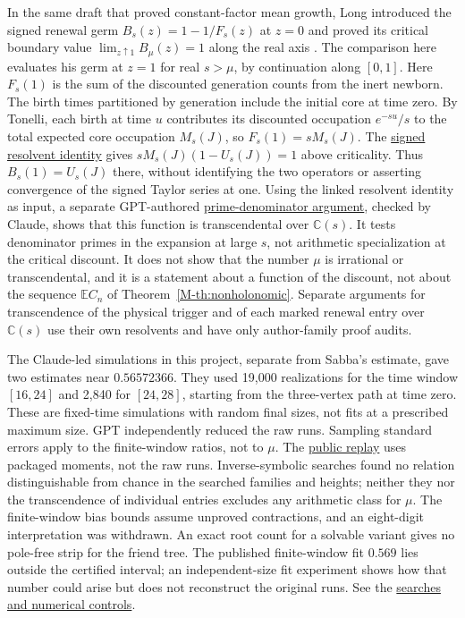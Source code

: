 \documentclass[11pt]{article}
\newcommand{\proofsrc}[2]{\href{https://github.com/uzay-eth/friend-tree-exponent/blob/a0972085ad72ad5685ae7b424988648d1965e73c/#1}{#2}}
\theoremstyle{remark}
\numberwithin{equation}{section}
\newcommand{\E}{\mathbb E}
\begin{document}
In the same draft that proved constant-factor mean growth, Long introduced the signed renewal germ $B_s(z)=1-1/F_s(z)$ at $z=0$ and proved its critical boundary value $\lim_{z\uparrow1}B_\mu(z)=1$ along the real axis \cite{LongMean}. The comparison here evaluates his germ at $z=1$ for real $s>\mu$, by continuation along $[0,1]$. Here $F_s(1)$ is the sum of the discounted generation counts from the inert newborn. The birth times partitioned by generation include the initial core at time zero. By Tonelli, each birth at time $u$ contributes its discounted occupation $e^{-su}/s$ to the total expected core occupation $M_s(J)$, so $F_s(1)=sM_s(J)$. The \proofsrc{round2/proofs/astra/source/round2/influence/zero/critical.md}{signed resolvent identity} gives $sM_s(J)(1-U_s(J))=1$ above criticality. Thus $B_s(1)=U_s(J)$ there, without identifying the two operators or asserting convergence of the signed Taylor series at one. Using the linked resolvent identity as input, a separate GPT-authored \proofsrc{round2/proofs/neon2/obstruction/REPORT.md}{prime-denominator argument}, checked by Claude, shows that this function is transcendental over $\mathbb C(s)$. It tests denominator primes in the expansion at large $s$, not arithmetic specialization at the critical discount. It does not show that the number $\mu$ is irrational or transcendental, and it is a statement about a function of the discount, not about the sequence $\E C_n$ of Theorem~\ref{M-th:nonholonomic}. Separate arguments for transcendence of the physical trigger and of each marked renewal entry over $\mathbb C(s)$ use their own resolvents and have only author-family proof audits.

The Claude-led simulations in this project, separate from Sabba's estimate, gave two estimates near $0.56572366$. They used 19,000 realizations for the time window $[16,24]$ and 2,840 for $[24,28]$, starting from the three-vertex path at time zero. These are fixed-time simulations with random final sizes, not fits at a prescribed maximum size. GPT independently reduced the raw runs. Sampling standard errors apply to the finite-window ratios, not to $\mu$. The \proofsrc{round2/proofs/fable/CLAIM.md}{public replay} uses packaged moments, not the raw runs. Inverse-symbolic searches found no relation distinguishable from chance in the searched families and heights; neither they nor the transcendence of individual entries excludes any arithmetic class for $\mu$. The finite-window bias bounds assume unproved contractions, and an eight-digit interpretation was withdrawn. An exact root count for a solvable variant gives no pole-free strip for the friend tree. The published finite-window fit $0.569$ \cite[Fig.~6]{HKRZ} lies outside the certified interval; an independent-size fit experiment shows how that number could arise but does not reconstruct the original runs. See the \proofsrc{round2/proofs/fable/README.md}{searches and numerical controls}.
\end{document}
